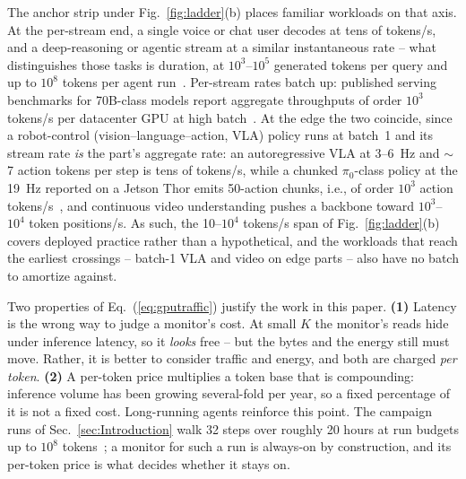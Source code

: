 The anchor strip under Fig.~\ref{fig:ladder}(b) places familiar
workloads on that axis. At the per-stream end, a single voice or chat
user decodes at tens of tokens/s, and a deep-reasoning or agentic
stream at a similar instantaneous rate -- what distinguishes those
tasks is duration, at $10^{3}$--$10^{5}$ generated tokens per query
and up to $10^{8}$ tokens per agent run~\cite{aisi2026cyber}.
Per-stream rates batch up: published serving benchmarks for 70B-class
models report aggregate throughputs of order $10^{3}$ tokens/s per
datacenter GPU at high batch~\cite{lyceum2026tps}. At the edge the
two coincide, since a robot-control (vision--language--action, VLA)
policy runs at batch~1 and its stream rate \emph{is} the part's
aggregate rate: an autoregressive VLA at 3--6~Hz and $\sim$7 action
tokens per step is tens of tokens/s, while a chunked $\pi_0$-class
policy at the 19~Hz reported on a Jetson Thor emits 50-action chunks,
i.e., of order $10^{3}$ action tokens/s~\cite{vlaperf2026}, and
continuous video understanding pushes a backbone toward
$10^{3}$--$10^{4}$ token positions/s. As such, the 10--$10^{4}$
tokens/s span of Fig.~\ref{fig:ladder}(b) covers deployed practice
rather than a hypothetical, and the workloads that reach the earliest
crossings -- batch-1 VLA and video on edge parts -- also have no
batch to amortize against.

Two properties of Eq.~(\ref{eq:gputraffic}) justify the work in this
paper. {\bf (1)} Latency is the wrong way to judge a monitor's cost.
At small $K$ the monitor's reads hide under inference latency, so it
\emph{looks} free -- but the bytes and the energy still must move.
Rather, it is better to consider traffic and energy, and
both are charged \emph{per token}. {\bf (2)} A per-token price
multiplies a token base that is compounding: inference volume has
been growing several-fold per year, so a fixed percentage of it is
not a fixed cost. Long-running agents reinforce this
point.
The campaign runs of Sec.~\ref{sec:Introduction} walk 32 steps over
roughly 20 hours at run budgets up to $10^{8}$
tokens~\cite{aisi2026cyber}; a monitor for such a run is always-on by
construction, and its per-token price is what decides whether it
stays on.


